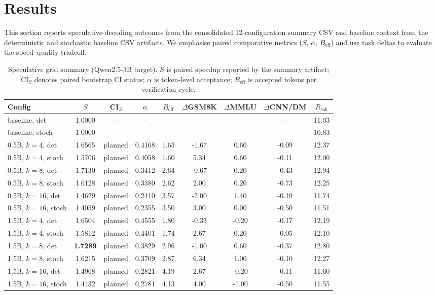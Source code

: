 \section{Results}
\label{sec:results}

This section reports speculative-decoding outcomes from
the consolidated 12-configuration summary CSV and baseline context from the
deterministic and stochastic baseline CSV artifacts. We emphasise paired comparative
metrics ($S$, $\alpha$, $B_{\text{eff}}$) and use task deltas to evaluate the
speed--quality tradeoff.

\begin{table}[t]
\centering
\caption{Speculative grid summary (Qwen2.5-3B target). $S$ is paired speedup
reported by the summary artifact; CI$_S$ denotes paired bootstrap CI status;
$\alpha$ is token-level acceptance; $B_{\text{eff}}$ is accepted tokens per
verification cycle.}
\label{tab:headline}
\small
\begin{tabular}{l c c c c c c c c}
\hline
\textbf{Config} & $S$ & CI$_S$ & $\alpha$ & $B_{\text{eff}}$ & $\Delta$GSM8K & $\Delta$MMLU & $\Delta$CNN/DM & $R_{\text{tok}}$ \\
\hline
baseline, det        & 1.0000 & -- & -- & -- & -- & -- & -- & 11.03 \\
baseline, stoch      & 1.0000 & -- & -- & -- & -- & -- & -- & 10.83 \\
0.5B, $k{=}4$, det   & 1.6565 & planned & 0.4168 & 1.65 & -1.67 & 0.60 & -0.09 & 12.37 \\
0.5B, $k{=}4$, stoch & 1.5706 & planned & 0.4058 & 1.60 & 5.34  & 0.60 & -0.11 & 12.00 \\
0.5B, $k{=}8$, det   & 1.7130 & planned & 0.3412 & 2.64 & -0.67 & 0.20 & -0.43 & 12.94 \\
0.5B, $k{=}8$, stoch & 1.6128 & planned & 0.3380 & 2.62 & 2.00  & 0.20 & -0.73 & 12.25 \\
0.5B, $k{=}16$, det  & 1.4629 & planned & 0.2410 & 3.57 & -2.00 & 1.40 & -0.19 & 11.74 \\
0.5B, $k{=}16$, stoch& 1.4059 & planned & 0.2355 & 3.50 & 3.00  & 0.00 & -0.50 & 11.51 \\
1.5B, $k{=}4$, det   & 1.6504 & planned & 0.4555 & 1.80 & -0.33 & -0.20 & -0.17 & 12.19 \\
1.5B, $k{=}4$, stoch & 1.5812 & planned & 0.4401 & 1.74 & 2.67  & 0.20 & -0.05 & 12.10 \\
1.5B, $k{=}8$, det   & \textbf{1.7289} & planned & 0.3829 & 2.96 & -1.00 & 0.60 & -0.37 & 12.80 \\
1.5B, $k{=}8$, stoch & 1.6215 & planned & 0.3709 & 2.87 & 6.34  & 1.00 & -0.10 & 12.27 \\
1.5B, $k{=}16$, det  & 1.4968 & planned & 0.2821 & 4.19 & 2.67  & -0.20 & -0.11 & 11.60 \\
1.5B, $k{=}16$, stoch& 1.4432 & planned & 0.2781 & 4.13 & 4.00  & -1.00 & -0.50 & 11.55 \\
\hline
\end{tabular}
\end{table}

